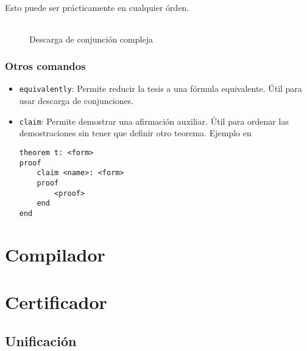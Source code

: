 Esto puede ser prácticamente en cualquier órden.

\begin{figure}
    \centering
    \caption{Descarga de conjunción compleja}
\begin{tabular}{c}

\end{tabular}
\end{figure}


\subsubsection{Otros comandos}

\begin{itemize}
    \item \lstinline{equivalently}: Permite reducir la tesis a una fórmula
    equivalente. Útil para usar descarga de conjunciones.
    
    

    \item \lstinline{claim}: Permite demostrar una afirmación auxiliar. Útil
    para ordenar las demostraciones sin tener que definir otro teorema. Ejemplo
    en 

    \begin{lstlisting}
theorem t: <form>
proof
    claim <name>: <form>
    proof
        <proof>
    end
end
    \end{lstlisting}
\end{itemize}


\section{Compilador}

\section{Certificador}

\subsection{Unificación}
\label{ppa:sec:unification}